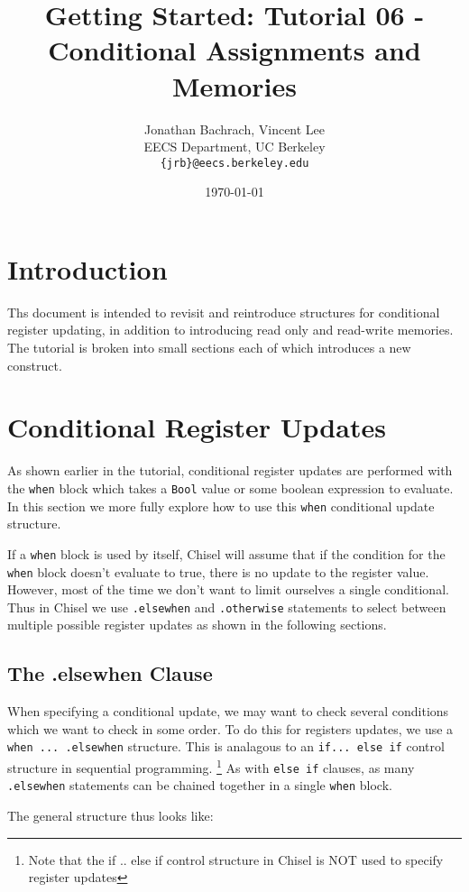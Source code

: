 \documentclass[twocolumn, 10pt]{article}
\title{Getting Started: Tutorial 06 - Conditional Assignments and Memories}
\author{Jonathan Bachrach, Vincent Lee \\
EECS Department, UC Berkeley\\
{\tt  \{jrb\}@eecs.berkeley.edu}
}
\date{\today}
\begin{document}
\maketitle{}

\section{Introduction}

Ths document is intended to revisit and reintroduce structures for conditional register updating, in addition to introducing read only and read-write memories. The tutorial is broken into small sections each of which introduces a new construct.

\section{Conditional Register Updates}

As shown earlier in the tutorial, conditional register updates are performed with the \verb+when+ block which takes a \verb+Bool+ value or some boolean expression to evaluate.
In this section we more fully explore how to use this \verb+when+ conditional update structure.

If a \verb+when+ block is used by itself, Chisel will assume that if the condition for the \verb+when+ block doesn't evaluate to true, there is no update to the register value. However, most of the time we don't want to limit ourselves a single conditional. Thus in Chisel we use \verb+.elsewhen+ and \verb+.otherwise+ statements to select between multiple possible register updates as shown in the following sections.

\subsection{The .elsewhen Clause}

When specifying a conditional update, we may want to check several conditions which we want to check in some order. 
To do this for registers updates, we use a \verb+when ... .elsewhen+ structure. This is analagous to an \verb+if... else if+ control structure in sequential programming. \footnote{Note that the if .. else if control structure in Chisel is NOT used to specify register updates} 
As with \verb+else if+ clauses, as many \verb+.elsewhen+ statements can be chained together in a single \verb+when+ block. 

The general structure thus looks like:
\end{document}
